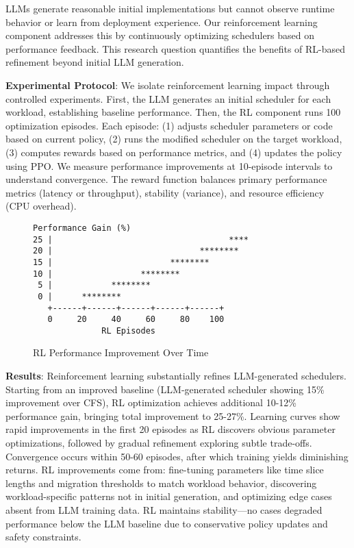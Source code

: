 LLMs generate reasonable initial implementations but cannot observe runtime behavior or learn from deployment experience. Our reinforcement learning component addresses this by continuously optimizing schedulers based on performance feedback. This research question quantifies the benefits of RL-based refinement beyond initial LLM generation.

\textbf{Experimental Protocol}: We isolate reinforcement learning impact through controlled experiments. First, the LLM generates an initial scheduler for each workload, establishing baseline performance. Then, the RL component runs 100 optimization episodes. Each episode: (1) adjusts scheduler parameters or code based on current policy, (2) runs the modified scheduler on the target workload, (3) computes rewards based on performance metrics, and (4) updates the policy using PPO. We measure performance improvements at 10-episode intervals to understand convergence. The reward function balances primary performance metrics (latency or throughput), stability (variance), and resource efficiency (CPU overhead).

\begin{figure}[h]
\centering
\caption{RL Performance Improvement Over Time}
\label{fig:rl-improvement}
\begin{verbatim}
Performance Gain (%)
25 |                                    ****
20 |                              ********
15 |                        ********
10 |                  ********
 5 |            ********
 0 |      ********
   +------+------+------+------+------+
   0     20     40     60     80    100
              RL Episodes
\end{verbatim}
\end{figure}

\textbf{Results}: Reinforcement learning substantially refines LLM-generated schedulers. Starting from an improved baseline (LLM-generated scheduler showing 15\% improvement over CFS), RL optimization achieves additional 10-12\% performance gain, bringing total improvement to 25-27\%. Learning curves show rapid improvements in the first 20 episodes as RL discovers obvious parameter optimizations, followed by gradual refinement exploring subtle trade-offs. Convergence occurs within 50-60 episodes, after which training yields diminishing returns. RL improvements come from: fine-tuning parameters like time slice lengths and migration thresholds to match workload behavior, discovering workload-specific patterns not in initial generation, and optimizing edge cases absent from LLM training data. RL maintains stability—no cases degraded performance below the LLM baseline due to conservative policy updates and safety constraints.


